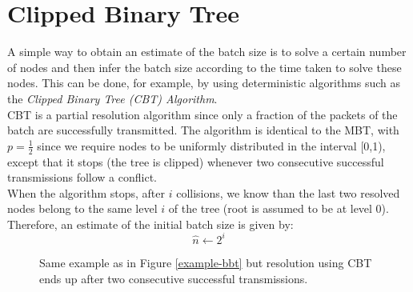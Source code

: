 \documentclass[11pt,a4paper,twoside,openright]{book}
\begin{document}
\section{Clipped Binary Tree}
\label{cbt-estimation}
A simple way to obtain an estimate of the batch size is to solve a certain number of nodes and then infer the batch size according to the time taken to solve these nodes. This can be done, for example, by using deterministic algorithms such as the \emph{Clipped Binary Tree (CBT) Algorithm}.\\
CBT is a partial resolution algorithm since only a fraction of the packets of the batch are successfully transmitted.
The algorithm is identical to the MBT, with $\displaystyle p=\frac{1}{2}$ since we require nodes to be uniformly distributed in the interval [0,1), except that it stops (the tree is clipped) whenever two consecutive successful transmissions follow a conflict.\\
When the algorithm stops, after $i$ collisions, we know than the last two resolved nodes belong to the same level $i$ of the tree (root is assumed to be at level 0). Therefore, an estimate of the initial batch size is given by:
\begin{equation}
\hat{n}\gets2^{i}
\end{equation}

\begin{figure}[H]
\centering
{}
\caption[\emph{CBT}: Example]{ Same example as in Figure \ref{example-bbt} but resolution using CBT ends up after two consecutive successful transmissions.}
\end{figure}
\end{document}
